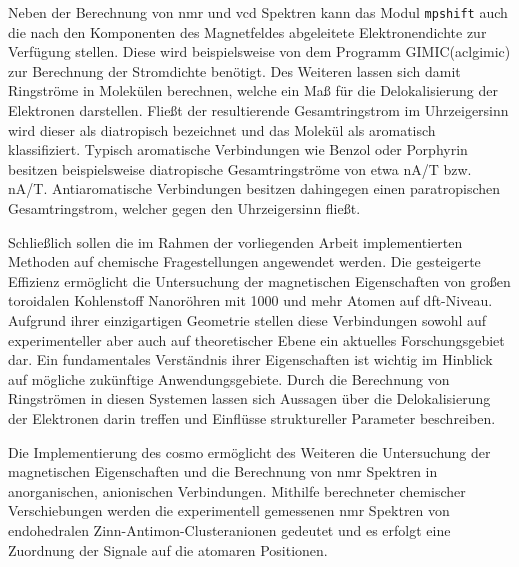 Neben der Berechnung von \ac{nmr} und \ac{vcd} Spektren kann das Modul \texttt{mpshift} auch die nach den Komponenten des Magnetfeldes abgeleitete Elektronendichte zur Verfügung stellen. Diese wird beispielsweise von dem Programm GIMIC(acl{gimic})\supercite{juselius2004calculation,taubert2011calculation,fliegl2011gauge,sundholm2016calculations} zur Berechnung der Stromdichte benötigt. Des Weiteren lassen sich damit Ringströme in Molekülen berechnen, welche ein Maß für die Delokalisierung der Elektronen darstellen. Fließt der resultierende Gesamtringstrom im Uhrzeigersinn wird dieser als diatropisch bezeichnet und das Molekül als aromatisch klassifiziert. Typisch aromatische Verbindungen wie Benzol oder Porphyrin besitzen beispielsweise diatropische Gesamtringströme von etwa \unit[12]{nA/T} bzw. \unit[27]{nA/T}.\supercite{fliegl2012aromatic} Antiaromatische Verbindungen besitzen dahingegen einen paratropischen Gesamtringstrom, welcher gegen den Uhrzeigersinn fließt.

\bigskip
Schließlich sollen die im Rahmen der vorliegenden Arbeit implementierten Methoden auf chemische Fragestellungen angewendet werden. Die gesteigerte Effizienz ermöglicht die Untersuchung der magnetischen Eigenschaften von großen toroidalen Kohlenstoff Nanoröhren mit 1000 und mehr Atomen auf \ac{dft}-Niveau. Aufgrund ihrer einzigartigen Geometrie stellen diese Verbindungen sowohl auf experimenteller aber auch auf theoretischer Ebene ein aktuelles Forschungsgebiet dar. Ein fundamentales Verständnis ihrer Eigenschaften ist wichtig im Hinblick auf mögliche zukünftige Anwendungsgebiete. Durch die Berechnung von Ringströmen in diesen Systemen lassen sich Aussagen über die Delokalisierung der Elektronen darin treffen und Einflüsse struktureller Parameter beschreiben. 

Die Implementierung des \ac{cosmo} ermöglicht des Weiteren die Untersuchung der magnetischen Eigenschaften und die Berechnung von \ac{nmr} Spektren in anorganischen, anionischen Verbindungen. Mithilfe berechneter chemischer Verschiebungen werden die experimentell gemessenen \ac{nmr} Spektren von endohedralen Zinn-Antimon-Clusteranionen gedeutet und es erfolgt eine Zuordnung der Signale auf die atomaren Positionen. 

